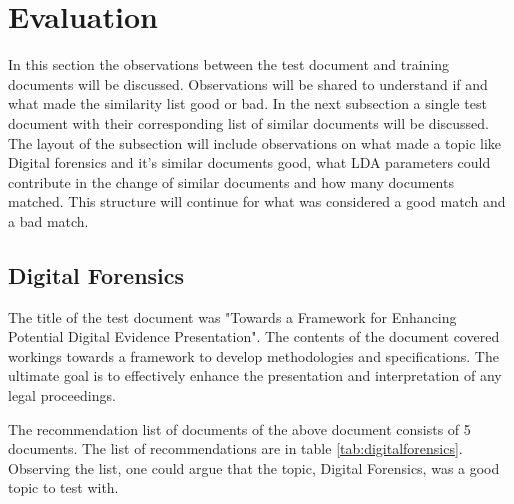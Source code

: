 \section{Evaluation} \label{ssec:eval}
In this section the observations between the test document and training documents will be discussed. Observations will be shared to understand if and what made the similarity list good or bad. 
In the next subsection a single test document with their corresponding list of similar documents will be discussed. The layout of the subsection will include observations on what made a topic like Digital forensics and it's similar documents good, what LDA parameters could contribute in the change of similar documents and how many documents matched. This structure will continue for what was considered a good match and a bad match.
\subsection{Digital Forensics}
The title of the test document was "Towards a Framework for Enhancing Potential Digital Evidence Presentation". The contents of the document covered workings towards a framework to develop methodologies and specifications. The ultimate goal is to effectively enhance the presentation and interpretation of any legal proceedings.

The recommendation list of documents of the above document consists of 5 documents. The list of recommendations are in table \ref{tab:digitalforensics}. Observing the list, one could argue that the topic, Digital Forensics, was a good topic to test with. 

\begin{table}[]
\centering
{}
\caption{Similarity for "Digital Forensic" topic}
\label{tab:digitalforensics}
\end{table}

